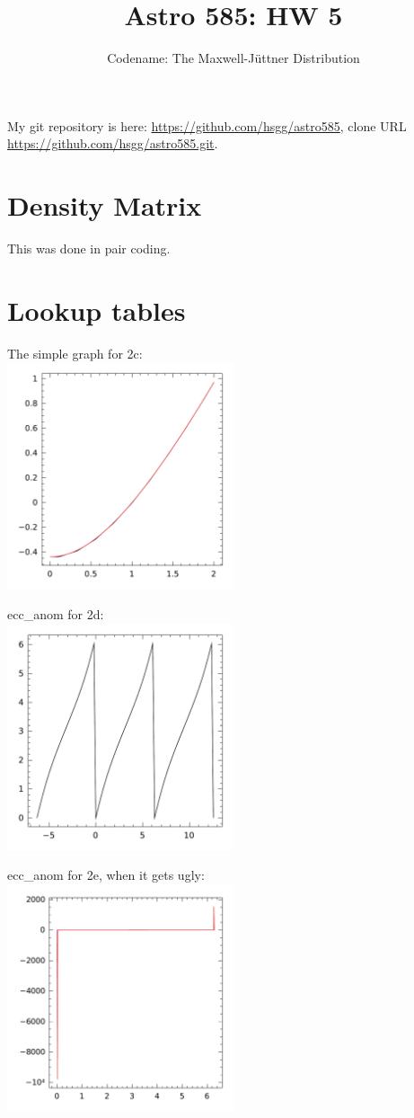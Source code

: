 \documentclass[11pt]{article}
\title{Astro 585: HW 5}
\author{Codename: The Maxwell-Jüttner Distribution}
\begin{document}
\maketitle

My git repository is here: \url{https://github.com/hsgg/astro585}, clone URL
\url{https://github.com/hsgg/astro585.git}.


\section{Density Matrix}
This was done in pair coding.


\section{Lookup tables}


The simple graph for 2c:\\
\includegraphics[width=0.5\textwidth]{2c_test.pdf}

ecc\_anom for 2d:\\
\includegraphics[width=0.5\textwidth]{2d_ecc_anom.pdf}

ecc\_anom for 2e, when it gets ugly:\\
\includegraphics[width=0.5\textwidth]{2e_ecc_anom_poor.pdf}
\end{document}
